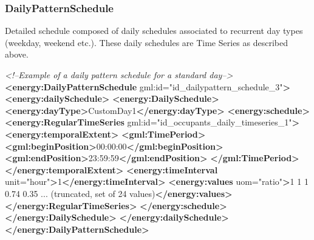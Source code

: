 \documentclass[a4paper,12pt]{article}
\newenvironment{Shaded}{}{}
\newcommand{\KeywordTok}[1]{\textcolor[rgb]{0.00,0.44,0.13}{\textbf{{#1}}}}
\newcommand{\StringTok}[1]{\textcolor[rgb]{0.25,0.44,0.63}{{#1}}}
\newcommand{\CommentTok}[1]{\textcolor[rgb]{0.38,0.63,0.69}{\textit{{#1}}}}
\newcommand{\OtherTok}[1]{\textcolor[rgb]{0.00,0.44,0.13}{{#1}}}
\newcommand{\NormalTok}[1]{{#1}}
\begin{document}
\subsubsection{DailyPatternSchedule}\label{dailypatternschedule}

Detailed schedule composed of daily schedules associated to recurrent
day types (weekday, weekend etc.). These daily schedules are Time Series
as described above.

\begin{Shaded}
\begin{Highlighting}[]
\CommentTok{<!--Example of a daily pattern schedule for a standard day-->}
\KeywordTok{<energy:DailyPatternSchedule}\OtherTok{ gml:id=}\StringTok{"id_dailypattern_schedule_3"}\KeywordTok{>}
    \KeywordTok{<energy:dailySchedule>}
        \KeywordTok{<energy:DailySchedule>}
            \KeywordTok{<energy:dayType>}\NormalTok{CustomDay1}\KeywordTok{</energy:dayType>}
            \KeywordTok{<energy:schedule>}
                \KeywordTok{<energy:RegularTimeSeries}\OtherTok{ gml:id=}\StringTok{"id_occupants_daily_timeseries_1"}\KeywordTok{>}
                    \KeywordTok{<energy:temporalExtent>}
                        \KeywordTok{<gml:TimePeriod>}
                            \KeywordTok{<gml:beginPosition>}\NormalTok{00:00:00}\KeywordTok{</gml:beginPosition>}
                            \KeywordTok{<gml:endPosition>}\NormalTok{23:59:59}\KeywordTok{</gml:endPosition>}
                        \KeywordTok{</gml:TimePeriod>}
                    \KeywordTok{</energy:temporalExtent>}
                    \KeywordTok{<energy:timeInterval}\OtherTok{ unit=}\StringTok{"hour"}\KeywordTok{>}\NormalTok{1}\KeywordTok{</energy:timeInterval>}
                    \KeywordTok{<energy:values}\OtherTok{ uom=}\StringTok{"ratio"}\KeywordTok{>}\NormalTok{1 1 1 0.74 0.35 ... (truncated, set of 24 values)}\KeywordTok{</energy:values>}
                \KeywordTok{</energy:RegularTimeSeries>}
            \KeywordTok{</energy:schedule>}
        \KeywordTok{</energy:DailySchedule>}
    \KeywordTok{</energy:dailySchedule>}
\KeywordTok{</energy:DailyPatternSchedule>}
\end{Highlighting}
\end{Shaded}
\end{document}
